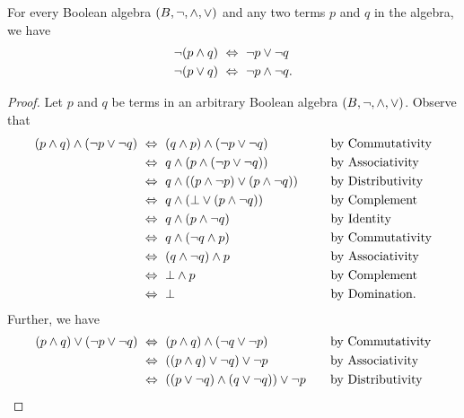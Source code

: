 \begin{theorem}
    For every Boolean algebra \((B, \neg, \wedge, \vee)\) and any two terms \(p\) and \(q\) in the algebra,
    we have
    \begin{align*}
        \neg (p \wedge q) &~\Leftrightarrow~ \neg p \vee \neg q\\
        \neg (p \vee q) &~\Leftrightarrow~ \neg p \wedge \neg q.
    \end{align*}
\end{theorem}
\begin{proof}
    Let \(p\) and \(q\) be terms in an arbitrary Boolean algebra \((B, \neg, \wedge, \vee)\).
    Observe that
    \begin{alignat*}{2}
        (p \meet q) \meet (\neg p \join \neg q) &\iff (q \meet p) \meet (\neg p \join \neg q)~~~~~~~~~~~~&&\text{by Commutativity}\\
                                                &\iff q \meet (p \meet (\neg p \join \neg q)) &&\text{by Associativity}\\
                                                &\iff q \meet \pn*{(p \meet \neg p) \join (p \meet \neg q)} &&\text{by Distributivity}\\
                                                &\iff q \meet (\bot \join (p \meet \neg q)) &&\text{by Complement}\\
                                                &\iff q \meet (p \meet \neg q) &&\text{by Identity}\\
                                                &\iff q \meet (\neg q \meet p) &&\text{by Commutativity}\\
                                                &\iff (q \meet \neg q) \meet p &&\text{by Associativity}\\
                                                &\iff \bot \meet p &&\text{by Complement}\\
                                                &\iff \bot &&\text{by Domination}.
    \end{alignat*}
    Further, we have
    \begin{alignat*}{2}
        (p \meet q) \join (\neg p \join \neg q) &\iff (p \meet q) \meet (\neg q \join \neg p)~~~~~~~~~~~~&&\text{by Commutativity}\\
                                                &\iff \pn*{(p \meet q) \join \neg q} \join \neg p &&\text{by Associativity}\\
                                                &\iff \pn*{(p \join \neg q) \meet (q \join \neg q)} \join \neg p &&\text{by Distributivity}\\

\end{alignat*}
\end{proof}
